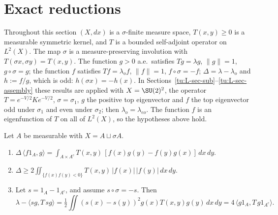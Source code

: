 
\section{Exact reductions}\label{tu:L-sec-exact}

Throughout this section $(X,dx)$ is a $\sigma$-finite measure space, $T(x,y)\ge 0$ is a measurable
symmetric kernel, and $T$ is a bounded self-adjoint operator on $L^2(X)$. The map $\sigma$ is a
measure-preserving involution with $T(\sigma x,\sigma y)=T(x,y)$. The function $g>0$ a.e.\ satisfies
$Tg=\lambda g$, $\|g\|=1$, $g\circ\sigma=g$; the function $f$ satisfies $Tf=\lambda_{o}f$, $\|f\|=1$,
$f\circ\sigma=-f$; $\Delta=\lambda-\lambda_o$ and $h:=f/g$, which is odd: $h(\sigma x)=-h(x)$.
In Sections~\ref{tu:L-sec-sub}--\ref{tu:L-sec-assembly} these results are applied with $X=\SU(2)^2$,
the operator $T=e^{-V/2}Ke^{-V/2}$, $\sigma=\sigma_1$, $g$ the positive top eigenvector and $f$ the
top eigenvector odd under $\sigma_1$ and even under $\sigma_2$; then $\lambda_o=\lambda_{eo}$.
The function $f$ is an eigenfunction of $T$ on all of $L^2(X)$, so the hypotheses above hold.

\begin{lemma}\label{tu:L-flux}
Let $A$ be measurable with $X=A\sqcup\sigma A$.
\begin{enumerate}
\item[(I0)] $\Delta\,\langle f1_A,g\rangle=\int_{A\times A^c}T(x,y)\,[f(x)g(y)-f(y)g(x)]\,dx\,dy$.
\item[(I1)] $\Delta\ge 2\iint_{\{f(x)f(y)<0\}}T(x,y)\,|f(x)|\,|f(y)|\,dx\,dy$.
\item[(I2)] Let $s=1_A-1_{A^c}$, and assume $s\circ\sigma=-s$. Then
\[
\lambda-\langle sg,T\,sg\rangle=\tfrac12\iint (s(x)-s(y))^2 g(x)T(x,y)g(y)\,dx\,dy
=4\,\langle g1_A,T\,g1_{A^c}\rangle .
\]
\end{enumerate}
\end{lemma}

